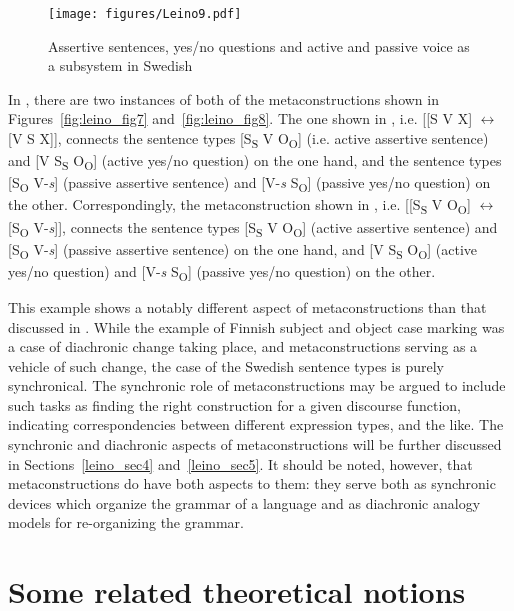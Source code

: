\documentclass[output=paper, colorlinks,citecolor=brown]{langsci/langscibook}
\begin{document}
\begin{figure}
    \texttt{[image: figures/Leino9.pdf]}
    \caption{Assertive sentences, yes/no questions and active and passive voice
as a subsystem in Swedish\label{fig:leino_fig9}}
\end{figure}

In , there are two instances of both of the metaconstructions shown in Figures~\ref{fig:leino_fig7} and~\ref{fig:leino_fig8}. The one shown in , i.e. [[S V X] $\leftrightarrow $ [V S X]], connects the sentence types [S\textsubscript{S} V O\textsubscript{O}] (i.e. active assertive sentence) and [V S\textsubscript{S} O\textsubscript{O}] (active yes/no question) on the one hand, and the sentence types [S\textsubscript{O} V-\textit{s}] (passive assertive sentence) and [V-\textit{s} S\textsubscript{O}] (passive yes/no question) on the other. Correspondingly, the metaconstruction shown in , i.e. [[S\textsubscript{S} V O\textsubscript{O}] $\leftrightarrow $ [S\textsubscript{O} V-\textit{s}]], connects the sentence types [S\textsubscript{S} V O\textsubscript{O}] (active assertive sentence) and [S\textsubscript{O} V-\textit{s}] (passive assertive sentence) on the one hand, and [V S\textsubscript{S} O\textsubscript{O}] (active yes/no question) and [V-\textit{s} S\textsubscript{O}] (passive yes/no question) on the other.

This example shows a notably different aspect of metaconstructions than that discussed in . While the example of Finnish subject and object case marking was a case of diachronic change taking place, and metaconstructions serving as a vehicle of such change, the case of the Swedish sentence types is purely synchronical. The synchronic role of metaconstructions may be argued to include such tasks as finding the right construction for a given discourse function, indicating correspondencies between different expression types, and the like. The synchronic and diachronic aspects of metaconstructions will be further discussed in Sections~\ref{leino_sec4} and~\ref{leino_sec5}. It should be noted, however, that metaconstructions do have both aspects to them: they serve both as synchronic devices which organize the grammar of a language and as diachronic analogy models for re-organizing the grammar.

\section{Some related theoretical notions}\label{leino_sec3}
\end{document}
